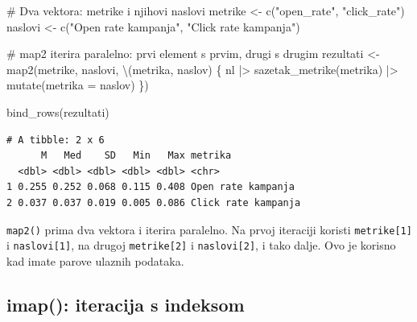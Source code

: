 \documentclass[
  croatian,
  letterpaper,
  DIV=11,
  numbers=noendperiod]{scrartcl}
\newenvironment{Shaded}{\begin{snugshade}}{\end{snugshade}}
\newcommand{\AttributeTok}[1]{\textcolor[rgb]{0.40,0.45,0.13}{#1}}
\newcommand{\CommentTok}[1]{\textcolor[rgb]{0.37,0.37,0.37}{#1}}
\newcommand{\FunctionTok}[1]{\textcolor[rgb]{0.28,0.35,0.67}{#1}}
\newcommand{\NormalTok}[1]{\textcolor[rgb]{0.00,0.23,0.31}{#1}}
\newcommand{\OtherTok}[1]{\textcolor[rgb]{0.00,0.23,0.31}{#1}}
\newcommand{\SpecialCharTok}[1]{\textcolor[rgb]{0.37,0.37,0.37}{#1}}
\newcommand{\StringTok}[1]{\textcolor[rgb]{0.13,0.47,0.30}{#1}}
\begin{document}
\begin{Shaded}
\begin{Highlighting}[]
\CommentTok{\# Dva vektora: metrike i njihovi naslovi}
\NormalTok{metrike }\OtherTok{\textless{}{-}} \FunctionTok{c}\NormalTok{(}\StringTok{"open\_rate"}\NormalTok{, }\StringTok{"click\_rate"}\NormalTok{)}
\NormalTok{naslovi }\OtherTok{\textless{}{-}} \FunctionTok{c}\NormalTok{(}\StringTok{"Open rate kampanja"}\NormalTok{, }\StringTok{"Click rate kampanja"}\NormalTok{)}

\CommentTok{\# map2 iterira paralelno: prvi element s prvim, drugi s drugim}
\NormalTok{rezultati }\OtherTok{\textless{}{-}} \FunctionTok{map2}\NormalTok{(metrike, naslovi, \textbackslash{}(metrika, naslov) \{}
\NormalTok{  nl }\SpecialCharTok{|\textgreater{}}
    \FunctionTok{sazetak\_metrike}\NormalTok{(metrika) }\SpecialCharTok{|\textgreater{}}
    \FunctionTok{mutate}\NormalTok{(}\AttributeTok{metrika =}\NormalTok{ naslov)}
\NormalTok{\})}

\FunctionTok{bind\_rows}\NormalTok{(rezultati)}
\end{Highlighting}
\end{Shaded}

\begin{verbatim}
# A tibble: 2 x 6
      M   Med    SD   Min   Max metrika            
  <dbl> <dbl> <dbl> <dbl> <dbl> <chr>              
1 0.255 0.252 0.068 0.115 0.408 Open rate kampanja 
2 0.037 0.037 0.019 0.005 0.086 Click rate kampanja
\end{verbatim}

\texttt{map2()} prima dva vektora i iterira paralelno. Na prvoj
iteraciji koristi \texttt{metrike{[}1{]}} i \texttt{naslovi{[}1{]}}, na
drugoj \texttt{metrike{[}2{]}} i \texttt{naslovi{[}2{]}}, i tako dalje.
Ovo je korisno kad imate parove ulaznih podataka.

\subsection{imap(): iteracija s
indeksom}\label{imap-iteracija-s-indeksom}
\end{document}
